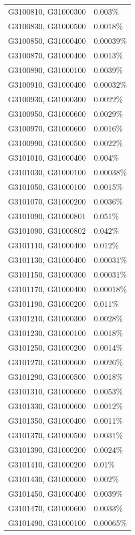 \begin{longtable}[]{@{}ll@{}}
G3100810, G31000300 & 0.003\% \\
G3100830, G31000500 & 0.0018\% \\
G3100850, G31000400 & 0.00039\% \\
G3100870, G31000400 & 0.0013\% \\
G3100890, G31000100 & 0.0039\% \\
G3100910, G31000400 & 0.00032\% \\
G3100930, G31000300 & 0.0022\% \\
G3100950, G31000600 & 0.0029\% \\
G3100970, G31000600 & 0.0016\% \\
G3100990, G31000500 & 0.0022\% \\
G3101010, G31000400 & 0.004\% \\
G3101030, G31000100 & 0.00038\% \\
G3101050, G31000100 & 0.0015\% \\
G3101070, G31000200 & 0.0036\% \\
G3101090, G31000801 & 0.051\% \\
G3101090, G31000802 & 0.042\% \\
G3101110, G31000400 & 0.012\% \\
G3101130, G31000400 & 0.00031\% \\
G3101150, G31000300 & 0.00031\% \\
G3101170, G31000400 & 0.00018\% \\
G3101190, G31000200 & 0.011\% \\
G3101210, G31000300 & 0.0028\% \\
G3101230, G31000100 & 0.0018\% \\
G3101250, G31000200 & 0.0014\% \\
G3101270, G31000600 & 0.0026\% \\
G3101290, G31000500 & 0.0018\% \\
G3101310, G31000600 & 0.0053\% \\
G3101330, G31000600 & 0.0012\% \\
G3101350, G31000400 & 0.0011\% \\
G3101370, G31000500 & 0.0031\% \\
G3101390, G31000200 & 0.0024\% \\
G3101410, G31000200 & 0.01\% \\
G3101430, G31000600 & 0.002\% \\
G3101450, G31000400 & 0.0039\% \\
G3101470, G31000600 & 0.0033\% \\
G3101490, G31000100 & 0.00065\% \\

\end{longtable}
